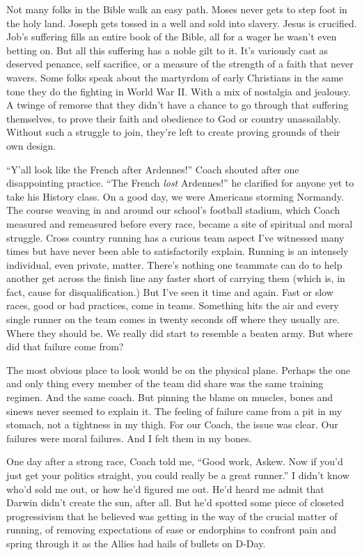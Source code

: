 \documentclass[12pt, oneside]{memoir}
\begin{document}
Not many folks in the Bible walk an easy path.
Moses never gets to step foot in the holy land.
Joseph gets tossed in a well and sold into slavery.
Jesus is crucified.
Job's suffering fills an entire book of the Bible, all for a wager
he wasn't even betting on.
But all this suffering has a noble gilt to it.
It's variously cast as deserved penance, self sacrifice, or a measure
of the strength of a faith that never wavers.
Some folks speak about the martyrdom of early Christians in the same
tone they do the fighting in World War II.
With a mix of nostalgia and jealousy.
A twinge of remorse that they didn't have a chance to go through that
suffering themselves, to prove their faith and obedience to God or
country unassailably.
Without such a struggle to join, they're left to create proving
grounds of their own design.

``Y'all look like the French after Ardennes!'' Coach shouted after one
disappointing practice.
``The French \textit{lost} Ardennes!'' he clarified for anyone yet to
take his History class.
On a good day, we were Americans storming Normandy.
The course weaving in and around our school's football
stadium, which Coach measured and remeasured before every race, became
a site of spiritual and moral struggle.
Cross country running has a curious team aspect I've witnessed many times
but have never been able to satisfactorily explain.
Running is an intensely individual, even private, matter.
There's nothing one teammate can do to help another get across the
finish line any faster short of carrying them (which is, in fact,
cause for disqualification.)
But I've seen it time and again.
Fast or slow races, good or bad practices, come in teams.
Something hits the air and every single runner on the team comes in
twenty seconds off where they usually are.
Where they should be.
We really did start to resemble a beaten army.
But where did that failure come from?

The most obvious place to look would be on the physical plane.
Perhaps the one and only thing every member of the team did share was
the same training regimen.
And the same coach.
But pinning the blame on muscles, bones and sinews never seemed to
explain it.
The feeling of failure came from a pit in my stomach, not a tightness
in my thigh.
For our Coach, the issue was clear.
Our failures were moral failures.
And I felt them in my bones.

One day after a strong race, Coach told me, ``Good work,
Askew. Now if you'd just get your politics straight, you could really
be a great runner.''
I didn't know who'd sold me out, or how he'd figured me out.
He'd heard me admit that Darwin didn't create the sun, after all.
But he'd spotted some piece of closeted progressivism that he believed
was getting in the way of the crucial matter of running, of removing
expectations of ease or endorphins to confront pain and spring through
it as the Allies had hails of bullets on D-Day. 
\end{document}
